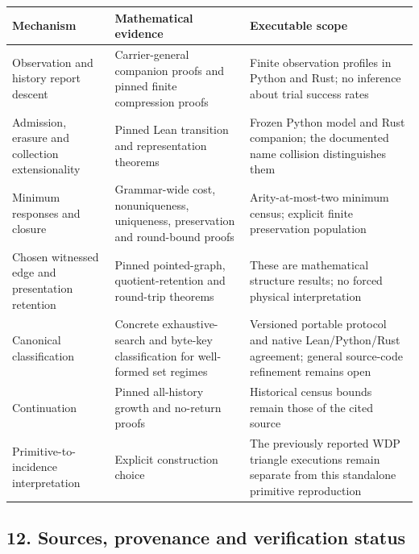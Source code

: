 \documentclass[
  11pt,
]{article}
\begin{document}
\begin{longtable}[]{@{}
  >{\raggedright\arraybackslash}p{}
  >{\raggedright\arraybackslash}p{}
  >{\raggedright\arraybackslash}p{}@{}}
\toprule\noalign{}
\begin{minipage}[b]{\linewidth}\raggedright
Mechanism
\end{minipage} & \begin{minipage}[b]{\linewidth}\raggedright
Mathematical evidence
\end{minipage} & \begin{minipage}[b]{\linewidth}\raggedright
Executable scope
\end{minipage} \\
\midrule\noalign{}
\endhead
\bottomrule\noalign{}
\endlastfoot
Observation and history report descent & Carrier-general companion
proofs and pinned finite compression proofs & Finite observation
profiles in Python and Rust; no inference about trial success rates \\
Admission, erasure and collection extensionality & Pinned Lean
transition and representation theorems & Frozen Python model and Rust
companion; the documented name collision distinguishes them \\
Minimum responses and closure & Grammar-wide cost, nonuniqueness,
uniqueness, preservation and round-bound proofs & Arity-at-most-two
minimum census; explicit finite preservation population \\
Chosen witnessed edge and presentation retention & Pinned pointed-graph,
quotient-retention and round-trip theorems & These are mathematical
structure results; no forced physical interpretation \\
Canonical classification & Concrete exhaustive-search and byte-key
classification for well-formed set regimes & Versioned portable protocol
and native Lean/Python/Rust agreement; general source-code refinement
remains open \\
Continuation & Pinned all-history growth and no-return proofs &
Historical census bounds remain those of the cited source \\
Primitive-to-incidence interpretation & Explicit construction choice &
The previously reported WDP triangle executions remain separate from
this standalone primitive reproduction \\
\end{longtable}

\subsection{12. Sources, provenance and verification
status}\label{sources-provenance-and-verification-status}
\end{document}
